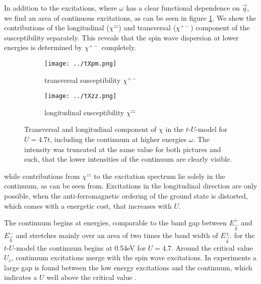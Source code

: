 In addition to the excitations, where $\omega$ has a clear functional dependence on $\vec q$, 
we find an area of continuous excitations, as can be seen in figure \ref{Xcomponents}.
We show the contributions of the longitudinal ($\chi^{zz}$) and transversal ($\chi^{+-}$) component of the susceptibility separately.
This reveals 
that the spin wave dispersion at lower energies is determined by $\chi^{+-}$ completely.
\begin{figure}
 \centering
 \begin{subfigure}{.49\linewidth}
\texttt{[image: ../tXpm.png]}
  \caption{transversal susceptibility $\chi^{+-}$}
 \end{subfigure}
\begin{subfigure}{.49\linewidth}
 \texttt{[image: ../tXzz.png]}
 \caption{longitudinal susceptibility $\chi^{zz}$}
\end{subfigure}
\caption{Transversal and longitudinal component of $\chi$ in the $t$-$U$-model for $U=4.7t$, including the continuum at higher energies $\omega$. 
	 The intensity was truncated at the same value for both pictures and such, that the lower intensities of the continuum are clearly visible.}
	 \label{Xcomponents}
\end{figure}
%
while contributions from $\chi^{zz}$ to the excitation spectrum lie solely in the continuum, as can be seen from.
Excitations in the longitudinal direction are only possible, when the anti-ferromagnetic ordering of the ground state 
is distorted, which comes with a energetic cost, that increases with $U$.

The continuum begins at energies, comparable to the band gap between $E^+_{\vec k}$ and $E^-_{\vec k}$ and 
stretches mainly over an area of two times the band width of $E^{\pm}_{\vec k}$.
for the $t$-$U$-model the continuum begins at 0.54eV for $U=4.7$.
Around the critical value $U_c$, continuum excitations merge with the spin wave excitations. 
In experiments a large gap is found between the low energy excitations and the continuum, which indicates a $U$ well above the critical value \cite{PhysRevLett.106.136402}. 

